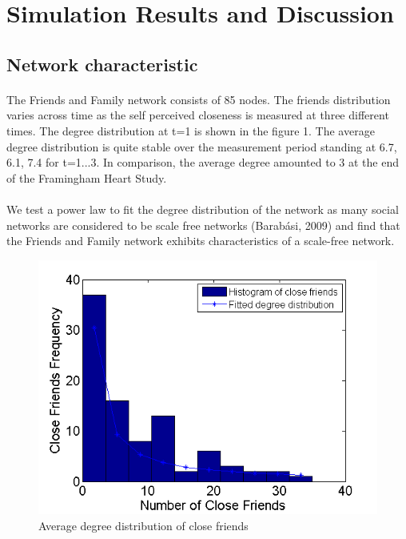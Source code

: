 \documentclass[11pt]{article}
\begin{document}
\section{Simulation Results and Discussion}

\subsection{Network characteristic}
\paragraph{}
The Friends and Family network consists of 85 nodes. The friends distribution varies across time as the self perceived closeness is measured at three different times. The degree distribution at t=1 is shown in the figure 1. The average degree distribution is quite stable over the measurement period standing at 6.7, 6.1, 7.4 for t=1...3. In comparison, the average degree amounted to 3 at the end of the Framingham Heart Study.

\paragraph{}
We test a power law to fit the degree distribution of the network as many social networks are considered to be scale free networks (Barabási, 2009) and find that the Friends and Family network exhibits characteristics of a scale-free network.

\begin{figure}[!h]
\center
   \includegraphics[scale = 0.9]{friends_distribution_figure1.png}
   \caption{\label{1} Average degree distribution of close friends}
\end{figure}
\end{document}
